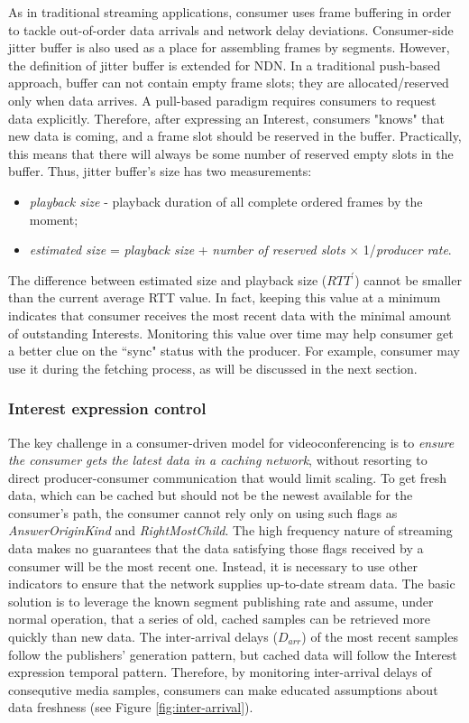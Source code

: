 \documentclass{icn/sig-alternate-2012} %
\begin{document}
As in traditional streaming applications, consumer uses frame buffering in order to tackle out-of-order data arrivals and network delay deviations. Consumer-side jitter buffer is also used as a place for assembling frames by segments. However, the definition of jitter buffer is extended for NDN. In a traditional push-based approach, buffer can not contain empty frame slots; they are allocated/reserved only when data arrives. A pull-based paradigm requires consumers to request data explicitly. Therefore, after expressing an Interest, consumers "knows" that new data is coming, and a frame slot should be reserved in the buffer. Practically, this means that there will always be some number of reserved empty slots in the buffer. Thus, jitter buffer's size has two measurements:
\begin{itemize}[label={}]
\item \textit{playback size} - playback duration of all complete ordered frames by the moment;
\item \textit{estimated size} = \textit{playback size} + \textit{number of reserved slots} $\times$ 1/\textit{producer rate}.
\end{itemize}

The difference between estimated size and playback size ($RTT^{\prime}$) cannot be smaller than the current average RTT value. In fact, keeping this value at a minimum indicates that consumer receives the most recent data with the minimal amount of outstanding Interests. Monitoring this value over time may help consumer get a better clue on the ``sync" status with the producer. For example, consumer may use it during the fetching process, as will be discussed in the next section. 

\subsubsection{Interest expression control}

The key challenge in a consumer-driven model for videoconferencing is to \emph{ensure the consumer gets the latest data in a caching network}, without resorting to direct producer-consumer communication that would limit scaling. To get fresh data, which can be cached but should not be the newest available for the consumer's path,  the consumer cannot rely only on using such flags as \textit{AnswerOriginKind} and \textit{RightMostChild}. The high frequency nature of streaming data makes no guarantees that the data satisfying those flags received by a consumer will be the most recent one. Instead, it is necessary to use other indicators to ensure that the network supplies up-to-date stream data. The basic solution is to leverage the known segment publishing rate and assume, under normal operation, that a series of old, cached samples can be retrieved more quickly than new data. The inter-arrival delays ($D_{arr}$) of the most recent samples follow the publishers' generation pattern, but cached data will follow the Interest expression temporal pattern. Therefore, by monitoring inter-arrival delays of consequtive media samples, consumers can make educated assumptions about data freshness (see Figure \ref{fig:inter-arrival}).
\end{document}

